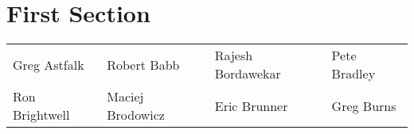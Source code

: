 \documentclass{article}
\begin{document}
\section{First Section}

\begin{centering}
\begin{tabular}{|llll|}
Greg Astfalk &
Robert Babb &
Rajesh Bordawekar &
Pete Bradley \\
Ron Brightwell &
Maciej Brodowicz &
Eric Brunner &
Greg Burns \\
\end{tabular}
\end{centering}
\end{document}
